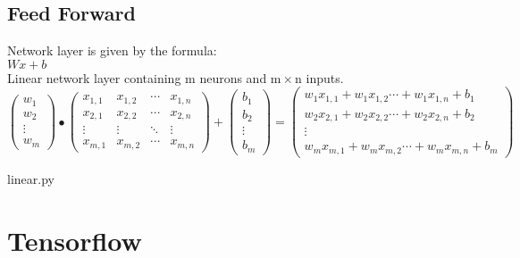 \documentclass[11pt,a4paper]{article}
\begin{document}
\subsection{Feed Forward}
Network layer is given by the formula:\\[11pt]
$W x + b$\\[11pt]
Linear network layer containing $\mathrm{m}$ neurons and $\mathrm{m} \times \mathrm{n}$ inputs.\\[11pt]
\[
\begin{pmatrix}
  w_{1} \\ %
  w_{2} \\ %
  \vdots \\ %
  w_{m} %
\end{pmatrix}
\bullet
\begin{pmatrix}
  x_{1,1} & x_{1,2} & \cdots & x_{1,n} \\
  x_{2,1} & x_{2,2} & \cdots & x_{2,n} \\
  \vdots & \vdots & \ddots & \vdots \\
  x_{m,1} & x_{m,2} & \cdots & x_{m,n}
\end{pmatrix}
+
\begin{pmatrix}
  b_{1} \\ %
  b_{2} \\ %
  \vdots \\ %
  b_{m} %
\end{pmatrix}
=
\begin{pmatrix}
  w_{1}x_{1,1}+w_{1}x_{1,2}\cdots + w_{1}x_{1,n}+b_{1}\\
  w_{2}x_{2,1}+w_{2}x_{2,2}\cdots + w_{2}x_{2,n}+b_{2}\\
  \vdots \\
  w_{m}x_{m,1}+w_{m}x_{m,2}\cdots + w_{m}x_{m,n}+b_{m}
\end{pmatrix}
\]



{linear.py}

\newpage
\section{Tensorflow}
\end{document}
